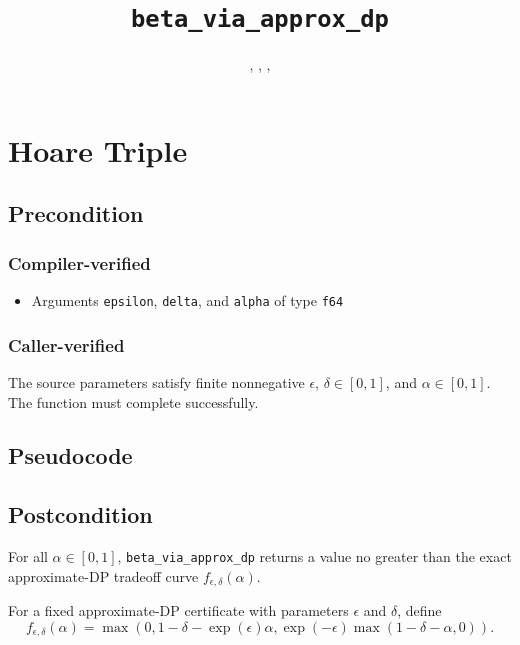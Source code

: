 \documentclass{article}
\title{\texttt{beta\_via\_approx\_dp}}
\author{\AishwaryaRamasethuAuthor, \YuJuKuAuthor, \JordanAwanAuthor, \MichaelShoemateAuthor}
\begin{document}
\maketitle

\contrib

\section{Hoare Triple}

\subsection*{Precondition}
\subsubsection*{Compiler-verified}
\begin{itemize}
    \item Arguments \texttt{epsilon}, \texttt{delta}, and \texttt{alpha} of type \texttt{f64}
\end{itemize}

\subsubsection*{Caller-verified}
The source parameters satisfy finite nonnegative $\epsilon$, $\delta \in [0,1]$,
and $\alpha \in [0,1]$. The function must complete successfully.

\subsection*{Pseudocode}



\subsection*{Postcondition}

\begin{theorem}
    For all $\alpha \in [0, 1]$, \texttt{beta\_via\_approx\_dp} returns a value
    no greater than the exact approximate-DP tradeoff curve
    $f_{\epsilon,\delta}(\alpha)$.
\end{theorem}

\begin{definition}
    \label{def-approxdp-point-beta}
    For a fixed approximate-DP certificate with parameters $\epsilon$ and $\delta$, define
    \begin{equation}
        f_{\epsilon,\delta}(\alpha) = \max(0, 1 - \delta - \exp(\epsilon) \alpha,
        \exp(-\epsilon) \max(1 - \delta - \alpha, 0)).
    \end{equation}
\end{definition}
\end{document}
